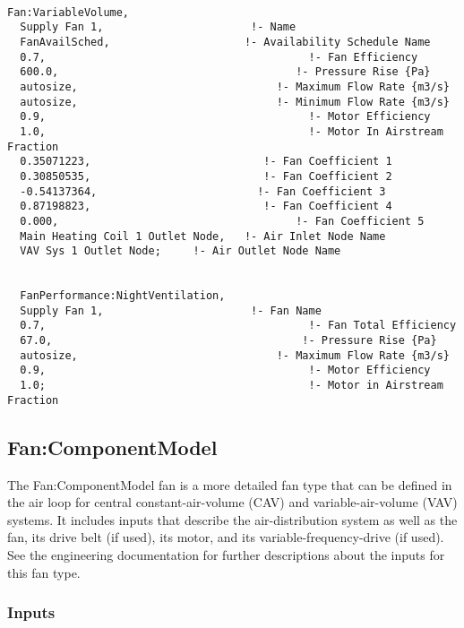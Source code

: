 \begin{lstlisting}

Fan:VariableVolume,
  Supply Fan 1,                       !- Name
  FanAvailSched,                     !- Availability Schedule Name
  0.7,                                         !- Fan Efficiency
  600.0,                                     !- Pressure Rise {Pa}
  autosize,                               !- Maximum Flow Rate {m3/s}
  autosize,                               !- Minimum Flow Rate {m3/s}
  0.9,                                         !- Motor Efficiency
  1.0,                                         !- Motor In Airstream Fraction
  0.35071223,                           !- Fan Coefficient 1
  0.30850535,                           !- Fan Coefficient 2
  -0.54137364,                         !- Fan Coefficient 3
  0.87198823,                           !- Fan Coefficient 4
  0.000,                                     !- Fan Coefficient 5
  Main Heating Coil 1 Outlet Node,   !- Air Inlet Node Name
  VAV Sys 1 Outlet Node;     !- Air Outlet Node Name


  FanPerformance:NightVentilation,
  Supply Fan 1,                       !- Fan Name
  0.7,                                         !- Fan Total Efficiency
  67.0,                                       !- Pressure Rise {Pa}
  autosize,                               !- Maximum Flow Rate {m3/s}
  0.9,                                         !- Motor Efficiency
  1.0;                                         !- Motor in Airstream Fraction
\end{lstlisting}

\subsection{Fan:ComponentModel}\label{fancomponentmodel}

The Fan:ComponentModel fan is a more detailed fan type that can be defined in the air loop for central constant-air-volume (CAV) and variable-air-volume (VAV) systems. It includes inputs that describe the air-distribution system as well as the fan, its drive belt (if used), its motor, and its variable-frequency-drive (if used). See the engineering documentation for further descriptions about the inputs for this fan type.

\subsubsection{Inputs}\label{inputs-5-011}

